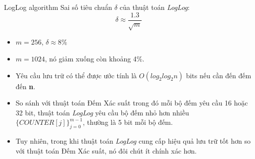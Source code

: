 \documentclass[10pt]{beamer}
\begin{document}
\begin{frame}{LogLog algorithm}
Sai số tiêu chuẩn $\delta$ của thuật toán \textit{LogLog}:
\[\delta \approx \frac{1.3}{\sqrt{m}}\]
\begin{itemize}
  \item $m = 256$, $\delta \approx 8\%$
  \item $m = 1024$, nó giảm xuống còn khoảng 4\%.
  \item Yêu cầu lưu trữ có thể được ước tính là $O(log_2log_2n)$ bits nếu cần đến đếm đến \textbf{n}.
  \item So sánh với thuật toán Đếm Xác suất trong đó mỗi bộ đếm yêu cầu 16 hoặc 32 bit, thuật toán \textit{LogLog} yêu cầu bộ đếm nhỏ hơn 
nhiều $\{COUNTER[j]\}_{j=0}^{m-1}$, thường là 5 bit mỗi bộ đếm. 
\item Tuy nhiên, trong khi thuật toán \textit{LogLog} cung cấp hiệu quả lưu trữ tốt hơn 
so với thuật toán Đếm Xác suất, nó đôi chút ít chính xác hơn.
\end{itemize}
\end{frame}
\end{document}
